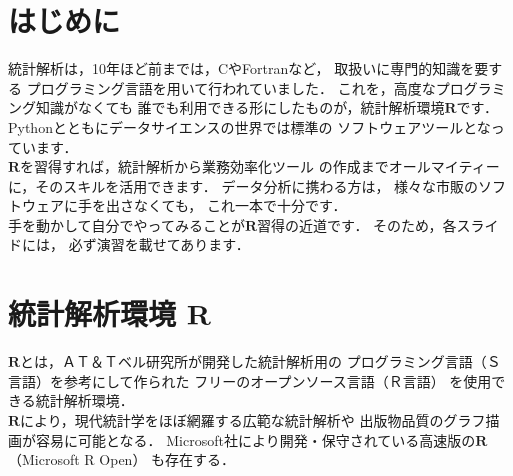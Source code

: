 \newcommand{\Release}{}
\newcommand{\Slide}{}
\newcommand{\PrintLecture}{1}
\newcommand{\PrintSolution}{0}






\newcommand{\R}{$\mathbf{R}$}
\newcommand{\RS}{$\mathbf{RStudio}$}
\newcommand{\Excel}{$\mathbf{Excel}$}



\maketitle

\MyFrame{}{\tableofcontents}

\section{はじめに}

\MyFrame{\insertsection}
{
  統計解析は，10年ほど前までは，CやFortranなど，
  取扱いに専門的知識を要する
  プログラミング言語を用いて行われていました．
  これを，高度なプログラミング知識がなくても
  誰でも利用できる形にしたものが，統計解析環境\R です．
  Pythonとともにデータサイエンスの世界では標準の
  ソフトウェアツールとなっています．\\
  \R を習得すれば，統計解析から業務効率化ツール
  の作成までオールマイティーに，そのスキルを活用できます．
  データ分析に携わる方は，
  様々な市販のソフトウェアに手を出さなくても，
  これ一本で十分です．\\
  手を動かして自分でやってみることが\R 習得の近道です．
  そのため，各スライドには，
  必ず演習を載せてあります．
}

\section{統計解析環境 \R}

\MyFrame{\insertsection}
{
  \R とは，ＡＴ＆Ｔベル研究所が開発した統計解析用の
  プログラミング言語（Ｓ言語）を参考にして作られた
  フリーのオープンソース言語（Ｒ言語）
  を使用できる統計解析環境．\\[3mm]

  \MyCols
  {
  }
  {
  }
  \R により，現代統計学をほぼ網羅する広範な統計解析や
  出版物品質のグラフ描画が容易に可能となる．
  Microsoft社により開発・保守されている高速版の\R
  （Microsoft R Open） も存在する．
}


